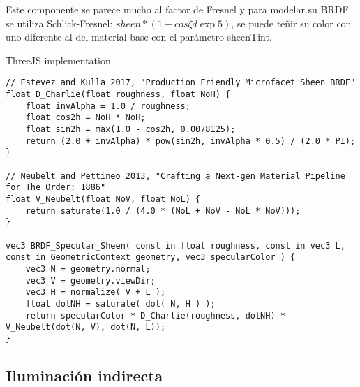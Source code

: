             Este componente se parece mucho al factor de Fresnel y para modelar su BRDF se
            utiliza Schlick-Fresnel: \(sheen * (1 − cos{\zeta}d\exp{5})\),  se puede te\~nir su
            color con uno diferente al del material base con el par\'ametro sheenTint.
            
            ThreeJS implementation
            \singlespacing
            \begin{lstlisting}[caption=My Javascript Example]
// Estevez and Kulla 2017, "Production Friendly Microfacet Sheen BRDF"
float D_Charlie(float roughness, float NoH) {
    float invAlpha = 1.0 / roughness;
    float cos2h = NoH * NoH;
    float sin2h = max(1.0 - cos2h, 0.0078125);
    return (2.0 + invAlpha) * pow(sin2h, invAlpha * 0.5) / (2.0 * PI);
}

// Neubelt and Pettineo 2013, "Crafting a Next-gen Material Pipeline for The Order: 1886"
float V_Neubelt(float NoV, float NoL) {
    return saturate(1.0 / (4.0 * (NoL + NoV - NoL * NoV)));
}

vec3 BRDF_Specular_Sheen( const in float roughness, const in vec3 L, const in GeometricContext geometry, vec3 specularColor ) {
    vec3 N = geometry.normal;
    vec3 V = geometry.viewDir;
    vec3 H = normalize( V + L );
    float dotNH = saturate( dot( N, H ) );
    return specularColor * D_Charlie(roughness, dotNH) * V_Neubelt(dot(N, V), dot(N, L));
}
            \end{lstlisting}
            \singlespacing


    \subsection{Iluminaci\'on indirecta}

\newpage